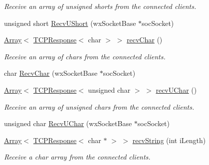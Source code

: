 \begin{DoxyCompactItemize}
\begin{DoxyCompactList}\small\item\em Receive an array of unsigned shorts from the connected clients. \end{DoxyCompactList}\item 
unsigned short \mbox{\hyperlink{class_rad_j_a_v_1_1_networking_1_1wx_widgets_t_c_p_server_a5ffedb767253cf86eff27accd77b5a6f}{Recv\+U\+Short}} (wx\+Socket\+Base $\ast$soc\+Socket)
\item 
\mbox{\hyperlink{class_rad_j_a_v_1_1_array}{Array}}$<$ \mbox{\hyperlink{class_rad_j_a_v_1_1_networking_1_1_t_c_p_response}{T\+C\+P\+Response}}$<$ char $>$ $>$ \mbox{\hyperlink{class_rad_j_a_v_1_1_networking_1_1wx_widgets_t_c_p_server_a260f0b6e48b6d861b42a4f7f31055be7}{recv\+Char}} ()
\begin{DoxyCompactList}\small\item\em Receive an array of chars from the connected clients. \end{DoxyCompactList}\item 
char \mbox{\hyperlink{class_rad_j_a_v_1_1_networking_1_1wx_widgets_t_c_p_server_a253113c833bf5ac8a384de6d2c61684d}{Recv\+Char}} (wx\+Socket\+Base $\ast$soc\+Socket)
\item 
\mbox{\hyperlink{class_rad_j_a_v_1_1_array}{Array}}$<$ \mbox{\hyperlink{class_rad_j_a_v_1_1_networking_1_1_t_c_p_response}{T\+C\+P\+Response}}$<$ unsigned char $>$ $>$ \mbox{\hyperlink{class_rad_j_a_v_1_1_networking_1_1wx_widgets_t_c_p_server_ae2987d75bd2abf728af2fab7f336b344}{recv\+U\+Char}} ()
\begin{DoxyCompactList}\small\item\em Receive an array of unsigned chars from the connected clients. \end{DoxyCompactList}\item 
unsigned char \mbox{\hyperlink{class_rad_j_a_v_1_1_networking_1_1wx_widgets_t_c_p_server_a424a50ecae9cde2a17b90e6a0fd2f32f}{Recv\+U\+Char}} (wx\+Socket\+Base $\ast$soc\+Socket)
\item 
\mbox{\hyperlink{class_rad_j_a_v_1_1_array}{Array}}$<$ \mbox{\hyperlink{class_rad_j_a_v_1_1_networking_1_1_t_c_p_response}{T\+C\+P\+Response}}$<$ char $\ast$ $>$ $>$ \mbox{\hyperlink{class_rad_j_a_v_1_1_networking_1_1wx_widgets_t_c_p_server_a3287134b3e032cfe794422652c0bcefe}{recv\+String}} (int i\+Length)
\begin{DoxyCompactList}\small\item\em Receive a char array from the connected clients. \end{DoxyCompactList}\item 

\end{DoxyCompactItemize}

